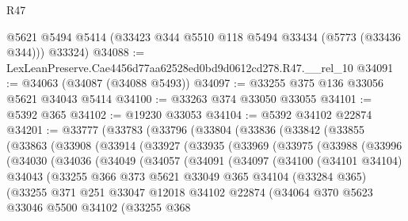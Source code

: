 \begin{lexlean}{R47}
\begin{coremodule}
      @5621
      @5494
      @5414
      (@33423 @344 @5510 @118 @5494 @33434 (@5773 (@33436 @344)))
      @33324)
@34088 := LexLeanPreserve.Cae4456d77aa62528ed0bd9d0612cd278.R47.__rel_10
@34091 := @34063 (@34087 (@34088 @5493))
@34097 := @33255 @375 @136 @33056 @5621 @34043 @5414
@34100 := @33263 @374 @33050 @33055
@34101 := @5392 @365
@34102 := @19230 @33053
@34104 := @5392 @34102 @22874
@34201 := @33777
    (@33783
      (@33796
        (@33804
          (@33836
            (@33842
              (@33855
                (@33863
                  (@33908
                    (@33914
                      (@33927
                        (@33935
                          (@33969
                            (@33975
                              (@33988
                                (@33996
                                  (@34030
                                    (@34036
                                      (@34049
                                        (@34057
                                          (@34091
                                            (@34097
                                              (@34100
                                                (@34101 @34104)
                                                @34043
                                                (@33255
                                                  @366
                                                  @373
                                                  @5621
                                                  @33049
                                                  @365
                                                  @34104
                                                  (@33284 @365)
                                                  (@33255
                                                    @371
                                                    @251
                                                    @33047
                                                    @12018
                                                    @34102
                                                    @22874
                                                    (@34064
                                                      @370
                                                      @5623
                                                      @33046
                                                      @5500
                                                      @34102
                                                      (@33255
                                                        @368

\end{coremodule}
\end{lexlean}
